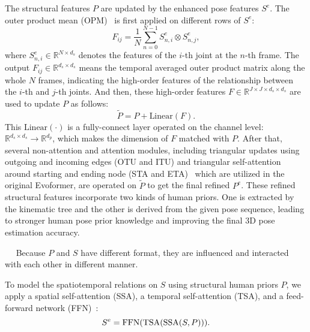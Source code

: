\documentclass{article}
\begin{document}
 The structural features $P$ are updated by the enhanced pose features $S^e$. The outer product mean (OPM)~\cite{jumper2021highly} is first applied on different rows of $S^e$:
\begin{equation}\label{ffn}
    F_{ij} = \frac{1}{N}\sum_{n=0}^{N-1} S^e_{n,i}\otimes S^e_{n,j},
\end{equation}
where $S^e_{n, i}\in\mathbb R^{N\times d_s}$ denotes the features of the $i$-th joint at the $n$-th frame. The output $F_{ij}\in\mathbb R^{d_s\times d_s}$ means the temporal averaged outer product matrix along the whole $N$ frames, indicating the high-order features of the relationship between the $i$-th and $j$-th joints. And then, these high-order features $F\in\mathbb R^{J\times J\times d_s\times d_s}$ are used to update $P$ as follows:
\begin{equation}
    \widetilde P = P + \text{Linear}(F).
\end{equation}
This $\text{Linear}(\cdot)$ is a fully-connect layer operated on the channel level: $\mathbb R^{d_s\times d_s}\rightarrow\mathbb R^{d_p}$, which makes the dimension of $F$ matched with $P$. After that, several non-attention and attention modules, including triangular updates using outgoing and incoming edges (OTU and ITU) and triangular self-attention around starting and ending node (STA and ETA)~\cite{jumper2021highly} which are utilized in the original Evoformer, are operated on $\widetilde P$ to get the final refined $P^e$. These refined structural features incorporate two kinds of human priors. One is extracted by the kinematic tree and the other is derived from the given pose sequence, leading to stronger human pose prior knowledge and improving the final 3D pose estimation accuracy.\vspace{-0.3em}



\iffalse　
Because $P$ and $S$ have different format, they are influenced and interacted with each other in different manner. 





To model the spatiotemporal relations on $S$ using structural human priors $P$, we apply a spatial self-attention (SSA), a temporal self-attention (TSA), and a feed-forward network (FFN)~\cite{vaswani2017attention}:\setlength\abovedisplayskip{0.1em}
\setlength\belowdisplayskip{0.1em}
\begin{equation}
    S^e = {\rm FFN}({\rm TSA}({\rm SSA}(S, P))).\vspace{-0.2em}
\end{equation}
\end{document}
